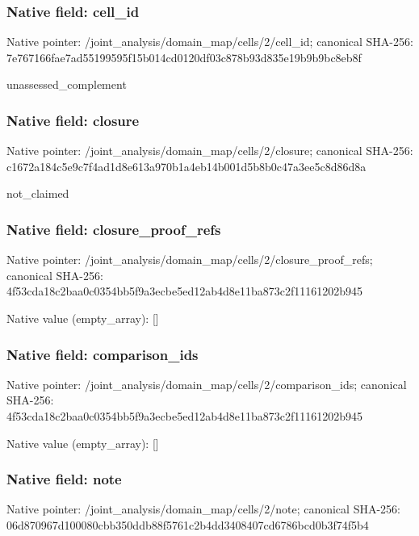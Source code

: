 \documentclass[10pt,a4paper]{article}
\begin{document}
\subsubsection{Native field: cell\_\allowbreak{}id}
Native pointer: /joint\_\allowbreak{}analysis/domain\_\allowbreak{}map/cells/2/cell\_\allowbreak{}id; canonical SHA-256: 7e767166fae7ad55199595f15b014cd0120df03c878b93d835e19b9b9bc8eb8f

\begingroup\raggedright\sloppy unassessed\_\allowbreak{}complement\par\endgroup

\subsubsection{Native field: closure}
Native pointer: /joint\_\allowbreak{}analysis/domain\_\allowbreak{}map/cells/2/closure; canonical SHA-256: c1672a184c5e9c7f4ad1d8e613a970b1a4eb14b001d5b8b0c47a3ee5c8d86d8a

\begingroup\raggedright\sloppy not\_\allowbreak{}claimed\par\endgroup

\subsubsection{Native field: closure\_\allowbreak{}proof\_\allowbreak{}refs}
Native pointer: /joint\_\allowbreak{}analysis/domain\_\allowbreak{}map/cells/2/closure\_\allowbreak{}proof\_\allowbreak{}refs; canonical SHA-256: 4f53cda18c2baa0c0354bb5f9a3ecbe5ed12ab4d8e11ba873c2f11161202b945

Native value (empty\_\allowbreak{}array): []

\subsubsection{Native field: comparison\_\allowbreak{}ids}
Native pointer: /joint\_\allowbreak{}analysis/domain\_\allowbreak{}map/cells/2/comparison\_\allowbreak{}ids; canonical SHA-256: 4f53cda18c2baa0c0354bb5f9a3ecbe5ed12ab4d8e11ba873c2f11161202b945

Native value (empty\_\allowbreak{}array): []

\subsubsection{Native field: note}
Native pointer: /joint\_\allowbreak{}analysis/domain\_\allowbreak{}map/cells/2/note; canonical SHA-256: 06d870967d100080cbb350ddb88f5761c2b4dd3408407cd6786bcd0b3f74f5b4
\end{document}
